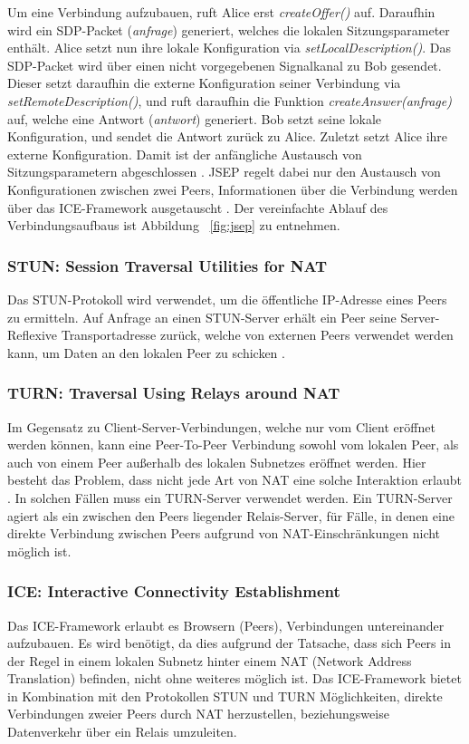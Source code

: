 Um eine Verbindung aufzubauen, ruft Alice erst \textit{createOffer()} auf. Daraufhin wird ein SDP-Packet (\textit{anfrage}) generiert, welches die lokalen Sitzungsparameter enthält. Alice setzt nun ihre lokale Konfiguration via \textit{setLocalDescription()}. Das \acs{SDP}-Packet wird über einen nicht vorgegebenen Signalkanal zu Bob gesendet. Dieser setzt daraufhin die externe Konfiguration seiner Verbindung via \textit{setRemoteDescription()}, und ruft daraufhin die Funktion \textit{createAnswer(anfrage)} auf, welche eine Antwort (\textit{antwort}) generiert. Bob setzt seine lokale Konfiguration, und sendet die Antwort zurück zu Alice. Zuletzt setzt Alice ihre externe Konfiguration. Damit ist der anfängliche Austausch von Sitzungsparametern abgeschlossen \cite{altanai2014}. \acs{JSEP} regelt dabei nur den Austausch von Konfigurationen zwischen zwei Peers, Informationen über die Verbindung werden über das \acs{ICE}-Framework ausgetauscht \cite{loreto2014}. Der vereinfachte Ablauf des Verbindungsaufbaus ist Abbildung ~\ref{fig:jsep} zu entnehmen.

\subsubsection{STUN: Session Traversal Utilities for NAT}
Das \acf{STUN}-Protokoll wird verwendet, um die öffentliche \acs{IP}-Adresse eines Peers zu ermitteln. Auf Anfrage an einen STUN-Server erhält ein Peer seine Server-Reflexive Transportadresse zurück, welche von externen Peers verwendet werden kann, um Daten an den lokalen Peer zu schicken \cite{stunRFC}.\par

\subsubsection{TURN: Traversal Using Relays around NAT}
Im Gegensatz zu Client-Server-Verbindungen, welche nur vom Client eröffnet werden können, kann eine Peer-To-Peer Verbindung sowohl vom lokalen Peer, als auch von einem Peer außerhalb des lokalen Subnetzes eröffnet werden. Hier besteht das Problem, dass nicht jede Art von \acs{NAT} eine solche Interaktion erlaubt \cite{natproblemsRFC}. In solchen Fällen muss ein \acf{TURN}-Server verwendet werden. Ein \acs{TURN}-Server agiert als ein zwischen den Peers liegender Relais-Server, für Fälle, in denen eine direkte Verbindung zwischen Peers aufgrund von \acs{NAT}-Einschränkungen nicht möglich ist.

\subsubsection{ICE: Interactive Connectivity Establishment}
Das \acf{ICE}-Framework erlaubt es Browsern (Peers), Verbindungen untereinander aufzubauen. Es wird benötigt, da dies aufgrund der Tatsache, dass sich Peers in der Regel in einem lokalen Subnetz hinter einem \acs{NAT} (Network Address Translation) befinden, nicht ohne weiteres möglich ist. Das \acs{ICE}-Framework bietet in Kombination mit den Protokollen \acs{STUN} und \acs{TURN} Möglichkeiten, direkte Verbindungen zweier Peers durch \acs{NAT} herzustellen, beziehungsweise Datenverkehr über ein Relais umzuleiten.\par

